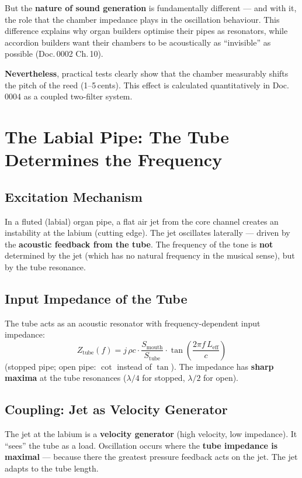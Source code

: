 \documentclass[11pt,a4paper]{article}
\begin{document}
But the \textbf{nature of sound generation} is fundamentally different --- and with it, the role that the chamber impedance plays in the oscillation behaviour. This difference explains why organ builders optimise their pipes as resonators, while accordion builders want their chambers to be acoustically as ``invisible'' as possible (Doc.\,0002 Ch.\,10).

\textbf{Nevertheless}, practical tests clearly show that the chamber measurably shifts the pitch of the reed (1--5\,cents). This effect is calculated quantitatively in Doc.\,0004 as a coupled two-filter system.

\section{The Labial Pipe: The Tube Determines the Frequency}

\subsection{Excitation Mechanism}

In a fluted (labial) organ pipe, a flat air jet from the core channel creates an instability at the labium (cutting edge). The jet oscillates laterally --- driven by the \textbf{acoustic feedback from the tube}. The frequency of the tone is \textbf{not} determined by the jet (which has no natural frequency in the musical sense), but by the tube resonance.

\subsection{Input Impedance of the Tube}

The tube acts as an acoustic resonator with frequency-dependent input impedance:
\begin{equation}
Z_\text{tube}(f) = j\,\rho c \cdot \frac{S_\text{mouth}}{S_\text{tube}} \cdot \tan\!\left(\frac{2\pi f\, L_\text{eff}}{c}\right)
\end{equation}
(stopped pipe; open pipe: $\cot$ instead of $\tan$). The impedance has \textbf{sharp maxima} at the tube resonances ($\lambda/4$ for stopped, $\lambda/2$ for open).

\subsection{Coupling: Jet as Velocity Generator}

The jet at the labium is a \textbf{velocity generator} (high velocity, low impedance). It ``sees'' the tube as a load. Oscillation occurs where the \textbf{tube impedance is maximal} --- because there the greatest pressure feedback acts on the jet. The jet adapts to the tube length.
\end{document}
